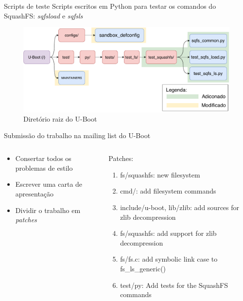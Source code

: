 \begin{frame}{Scripts de teste}
    Scripts escritos em Python para testar os comandos do SquashFS: \textit{sqfsload} e \textit{sqfsls}
    
    \begin{figure}
        \centering
        \includegraphics[scale=0.4]{figuras/tests.pdf}
        \caption{Diretório raiz do U-Boot}
        \label{fig:my_label}
    \end{figure}
\end{frame}

\begin{frame}{Submissão do trabalho na mailing list do U-Boot}
   \begin{columns}
   \begin{column}{0.5\textwidth}
\begin{itemize}
\item Consertar todos os problemas de estilo
\item Escrever uma carta de apresentação
\item Dividir o trabalho em \textit{patches}
\end{itemize}
   \end{column}

   \begin{column}{0.5\textwidth}
   Patches:
   \begin{enumerate}
   \item fs/squashfs: new filesystem
   \item cmd/: add filesystem commands
   \item include/u-boot, lib/zlib: add sources for zlib decompression
   \item fs/squashfs: add support for zlib decompression
   \item fs/fs.c: add symbolic link case to fs\_ls\_generic()
   \item test/py: Add tests for the SquashFS commands
   \end{enumerate}
   \end{column}
   \end{columns}
\end{frame}

